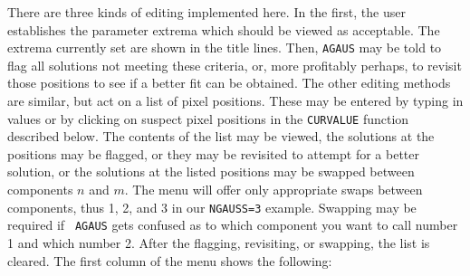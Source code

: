 \documentclass[twoside]{article}
\begin{document}
There are three kinds of editing implemented here.  In the first, the
user establishes the parameter extrema which should be viewed as
acceptable.  The extrema currently set are shown in the title lines.
Then, {\tt AGAUS} may be told to flag all solutions not meeting these
criteria, or, more profitably perhaps, to revisit those positions to
see if a better fit can be obtained.  The other editing methods are
similar, but act on a list of pixel positions.  These may be entered
by typing in values or by clicking on suspect pixel positions in the
{\tt CURVALUE} function described below.  The contents of the list may
be viewed, the solutions at the positions may be flagged, or they may
be revisited to attempt for a better solution, or the solutions at the
listed positions may be swapped between components $n$ and $m$.  The
menu will offer only appropriate swaps between components, thus 1, 2,
and 3 in our {\tt NGAUSS=3} example.  Swapping may be required if {\tt
  AGAUS} gets confused as to which component you want to call number 1
and which number 2.  After the flagging, revisiting, or swapping, the
list is cleared.    The first column of the menu shows the following:
\vfill\eject
\end{document}
